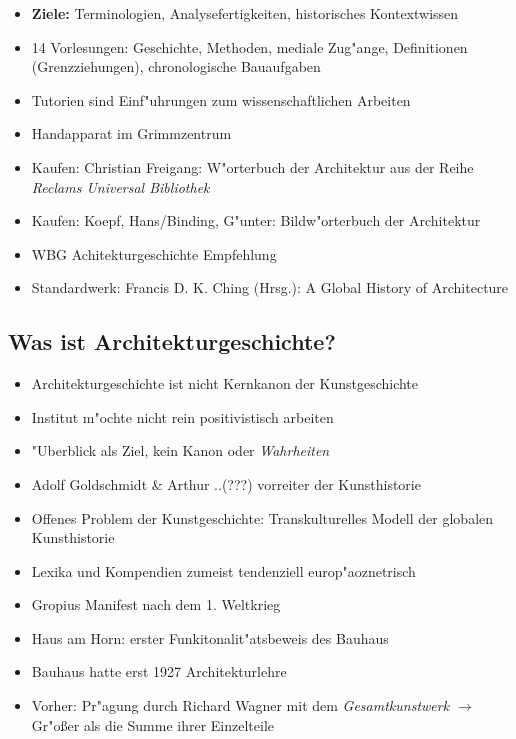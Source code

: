 \documentclass[]{scrartcl}
\begin{document}
\begin{itemize}
    \item \textbf{Ziele:} Terminologien, Analysefertigkeiten, historisches Kontextwissen
\item 14 Vorlesungen: Geschichte, Methoden, mediale Zug"ange, Definitionen (Grenzziehungen), chronologische Bauaufgaben
\item Tutorien sind Einf"uhrungen zum wissenschaftlichen Arbeiten
  \item Handapparat im Grimmzentrum
  \item Kaufen: Christian Freigang: W"orterbuch der Architektur aus der Reihe \emph{Reclams Universal Bibliothek}
    \item Kaufen: Koepf, Hans/Binding, G"unter: Bildw"orterbuch der Architektur
    \item WBG Achitekturgeschichte Empfehlung
    \item Standardwerk: Francis D. K. Ching (Hrsg.): A Global History of Architecture
    

\end{itemize}


\subsection{Was ist Architekturgeschichte?}

\begin{itemize}

    \item Architekturgeschichte ist nicht Kernkanon der Kunstgeschichte
    \item Institut m"ochte nicht rein positivistisch arbeiten
    \item "Uberblick als Ziel, kein Kanon oder \emph{Wahrheiten}
    \item Adolf Goldschmidt \& Arthur ..{\color{red}(???)} vorreiter der Kunsthistorie
    \item Offenes Problem der Kunstgeschichte: Transkulturelles Modell der globalen Kunsthistorie
    \item Lexika und Kompendien zumeist tendenziell europ"aoznetrisch
    \item Gropius Manifest nach dem 1. Weltkrieg
    \item Haus am Horn: erster Funkitonalit"atsbeweis des Bauhaus
    \item Bauhaus hatte erst 1927 Architekturlehre
    \item Vorher: Pr"agung durch Richard Wagner mit dem \emph{Gesamtkunstwerk} $\rightarrow$ Gr"oßer als die Summe ihrer Einzelteile

\end{itemize}
\end{document}

